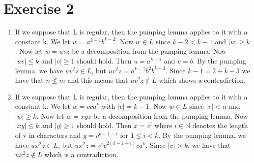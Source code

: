 \documentclass{article}
\begin{document}
\section*{Exercise 2}
\begin{enumerate}[label= \alph*)]
  \item
  If we suppose that L is regular, then the pumping lemma applies to it with a constant k. We let $w = a^{k-1}  b^{k - 2}$. Now $w \in L$ since $k - 2 < k - 1$ and $|w| \geq k$. Now let $w = uvz$ be a decomposition from the pumping lemma. Now $|uv| \leq k$ and $|v| \geq 1$ should hold. Then $u = a^{k - 1}$ and $v = b$. By the pumping lemma, we have $uv^2z \in L$, but $uv^2z = a^{k-1} b^2  b^{k - 3}$.
  Since $k - 1 = 2 + k - 3$ we have that $n \nleq m$ and this means that $uv^2z \notin L$ which shows a contradiction.
  \item
  If we suppose that L is regular, then the pumping lemma applies to it with a constant k. We let $w = vca^k$ with $|v| = k - 1$. Now $w \in L$ since $|v| < n$ and $|w| \geq k$. Now let $w = xyz$ be a decomposition from the pumping lemma. Now $|xy| \leq k$ and $|y| \geq 1$ should hold. Then $x = v^i$ where $i \in \mathbb{N}$ denotes the length of v in characters and $y = v^{k - 1 - i}$ for $1 \leq i < k$. By the pumping lemma, we have $ux^2z \in L$, but $ux^2z = v^i v^{2(k - 1 - i)} ca^k$. Since $|v| > k$, we have that $ux^2z \notin L$ which is a contradiction.
\end{enumerate}
\end{document}
